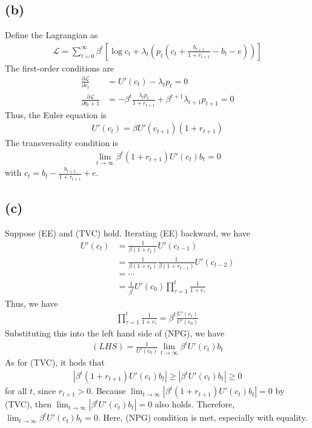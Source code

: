 \documentclass{ltjsarticle}
\begin{document}
\subsection*{(b)}
Define the Lagrangian as
\begin{gather*}
    \mathcal{L} = \sum_{t=0}^\infty \beta^t \left[ \log c_t + \lambda_t \left( p_t \left(c_t + \frac{b_{t+1}}{1+r_{t+1}} - b_t - e \right) \right) \right] 
\end{gather*}
The first-order conditions are
\begin{align*}
    \frac{\partial \mathcal{L}}{\partial c_t} &= U'(c_t) - \lambda_t p_t = 0 \\
    \frac{\partial \mathcal{L}}{\partial b_t+1} &= - \beta^t \frac{\lambda_t p_t}{1+r_{t+1}} + \beta^{t+1} \lambda_{t+1} p_{t+1} = 0
\end{align*}
Thus, the Euler equation is
\begin{gather*}
    U'(c_t) = \beta U'(c_{t+1})(1+r_{t+1}) \tag{EE}
\end{gather*}
The transversality condition is
\begin{gather*}
    \lim_{t \to \infty} \beta^t (1+r_{t+1}) U'(c_t) b_t = 0 \tag{TVC}
\end{gather*}
with $c_t = b_t - \frac{b_{t+1}}{1 + r_{t+1}} + e$.

\subsection*{(c)}
Suppose (EE) and (TVC) hold. Iterating (EE) backward, we have
\begin{align*}
    U'(c_t) 
    &= \frac{1}{\beta (1+r_{t})} U'(c_{t-1})\\
    &= \frac{1}{\beta (1+r_{t})} \frac{1}{\beta (1+r_{t-1})} U'(c_{t-2})\\
    &= \cdots \\
    &= \frac{1}{\beta^t} U'(c_{0}) \prod_{\tau=1}^{t} \frac{1}{1+r_{\tau}}
\end{align*}
Thus, we have
\begin{gather*}
    \prod_{\tau=1}^{t} \frac{1}{1+r_{\tau}} = \beta^t \frac{U'(c_t)}{U'(c_0)}
\end{gather*}
Substituting this into the left hand side of (NPG), we have
\begin{gather*}
    (LHS) = \frac{1}{U'(c_0)} \lim_{t \to \infty} \beta^t U'(c_t) b_t
\end{gather*}
As for (TVC), it hods that
\begin{gather*}
    |\beta^t (1+r_{t+1}) U'(c_t) b_t| \geq |\beta^t U'(c_t) b_t| \geq 0
\end{gather*}
for all $t$, since $r_{t+1}>0$.
Because $\lim_{t \to \infty} |\beta^t (1+r_{t+1}) U'(c_t) b_t| = 0$ by (TVC), then $\lim_{t \to \infty} |\beta^t U'(c_t) b_t| = 0$ also holds. Therefore, $\lim_{t \to \infty} \beta^t U'(c_t) b_t = 0$. Here, (NPG) condition is met, especially with equality.
\end{document}
